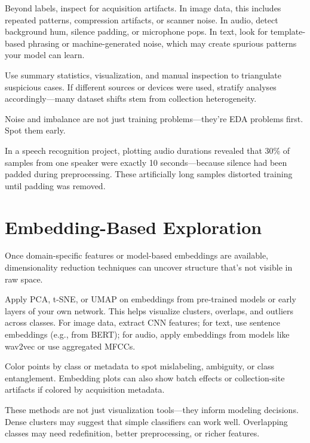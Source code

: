 \documentclass[12pt,openany]{book}
\begin{document}
Beyond labels, inspect for acquisition artifacts. In image data, this includes repeated patterns, compression artifacts, or scanner noise. In audio, detect background hum, silence padding, or microphone pops. In text, look for template-based phrasing or machine-generated noise, which may create spurious patterns your model can learn.
\newline

Use summary statistics, visualization, and manual inspection to triangulate suspicious cases. If different sources or devices were used, stratify analyses accordingly—many dataset shifts stem from collection heterogeneity.
\newline

Noise and imbalance are not just training problems—they're EDA problems first. Spot them early.

\begin{examplebox}
In a speech recognition project, plotting audio durations revealed that 30\% of samples from one speaker were exactly 10 seconds—because silence had been padded during preprocessing. These artificially long samples distorted training until padding was removed.
\end{examplebox}



\section{Embedding-Based Exploration}

Once domain-specific features or model-based embeddings are available, dimensionality reduction techniques can uncover structure that’s not visible in raw space.
\newline

Apply PCA, t-SNE, or UMAP on embeddings from pre-trained models or early layers of your own network. This helps visualize clusters, overlaps, and outliers across classes. For image data, extract CNN features; for text, use sentence embeddings (e.g., from BERT); for audio, apply embeddings from models like wav2vec or use aggregated MFCCs.
\newline

Color points by class or metadata to spot mislabeling, ambiguity, or class entanglement. Embedding plots can also show batch effects or collection-site artifacts if colored by acquisition metadata.
\newline

These methods are not just visualization tools—they inform modeling decisions. Dense clusters may suggest that simple classifiers can work well. Overlapping classes may need redefinition, better preprocessing, or richer features.
\end{document}
